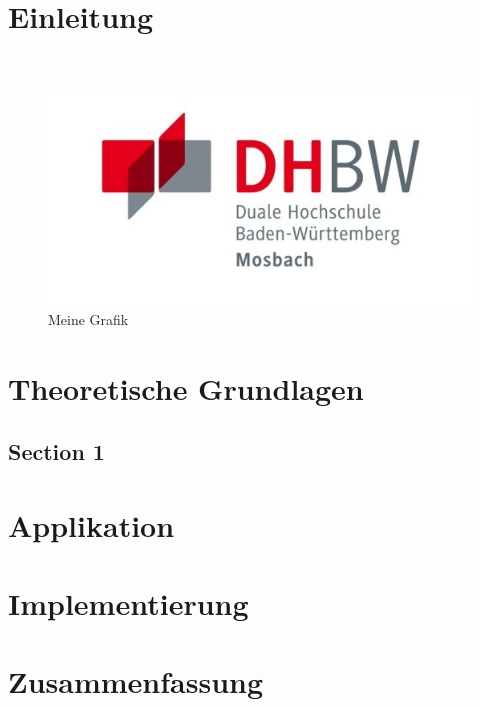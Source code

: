 \chapter{Einleitung} 
    \autocite[vgl.][S.1]{01} \\
    \begin{figure}[h]
        \centering
        \includegraphics{images/dhbw-logo.jpg}
        \caption{Meine Grafik}
        \label{fig:meine-grafik}
    \end{figure}
       

\chapter{Theoretische Grundlagen}

    \section{Section 1} 


\chapter{Applikation}


\chapter{Implementierung}


\chapter{Zusammenfassung} %
